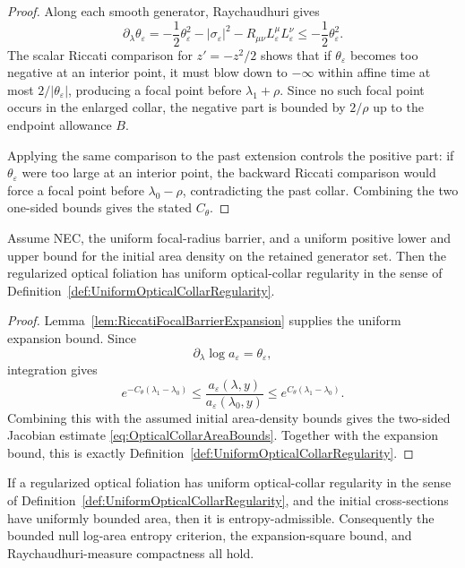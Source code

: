 \begin{proof}
Along each smooth generator, Raychaudhuri gives
\[
    \partial_\lambda\theta_\varepsilon
    =
    -\frac12\theta_\varepsilon^2
    -|\sigma_\varepsilon|^2
    -R_{\mu\nu}L_\varepsilon^\mu L_\varepsilon^\nu
    \le
    -\frac12\theta_\varepsilon^2 .
\]
The scalar Riccati comparison for $z'=-z^2/2$ shows that if $\theta_\varepsilon$ becomes too negative at an interior point, it must blow down to $-\infty$ within affine time at most $2/|\theta_\varepsilon|$, producing a focal point before $\lambda_1+\rho$. Since no such focal point occurs in the enlarged collar, the negative part is bounded by $2/\rho$ up to the endpoint allowance $B$.

Applying the same comparison to the past extension controls the positive part: if $\theta_\varepsilon$ were too large at an interior point, the backward Riccati comparison would force a focal point before $\lambda_0-\rho$, contradicting the past collar. Combining the two one-sided bounds gives the stated $C_\theta$.
\end{proof}

\begin{theorem}\label{thm:FocalBarrierOpticalCollar}
Assume NEC, the uniform focal-radius barrier, and a uniform positive lower and upper bound for the initial area density on the retained generator set. Then the regularized optical foliation has uniform optical-collar regularity in the sense of Definition~\ref{def:UniformOpticalCollarRegularity}.
\end{theorem}

\begin{proof}
Lemma~\ref{lem:RiccatiFocalBarrierExpansion} supplies the uniform expansion bound. Since
\[
    \partial_\lambda\log a_\varepsilon=\theta_\varepsilon ,
\]
integration gives
\[
    e^{-C_\theta(\lambda_1-\lambda_0)}
    \le
    \frac{a_\varepsilon(\lambda,y)}{a_\varepsilon(\lambda_0,y)}
    \le
    e^{C_\theta(\lambda_1-\lambda_0)} .
\]
Combining this with the assumed initial area-density bounds gives the two-sided Jacobian estimate \eqref{eq:OpticalCollarAreaBounds}. Together with the expansion bound, this is exactly Definition~\ref{def:UniformOpticalCollarRegularity}.
\end{proof}

\begin{theorem}\label{thm:OpticalCollarEntropyAdmissibility}
If a regularized optical foliation has uniform optical-collar regularity in the sense of Definition~\ref{def:UniformOpticalCollarRegularity}, and the initial cross-sections have uniformly bounded area, then it is entropy-admissible. Consequently the bounded null log-area entropy criterion, the expansion-square bound, and Raychaudhuri-measure compactness all hold.
\end{theorem}

